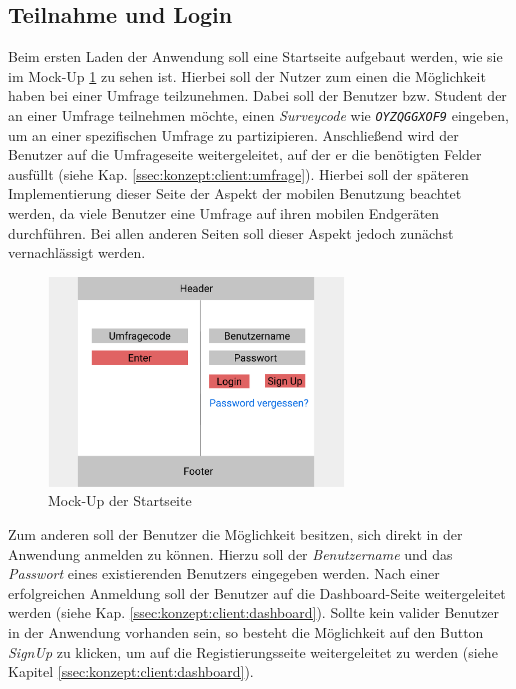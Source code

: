 \subsection{Teilnahme und Login}

Beim ersten Laden der Anwendung soll eine Startseite aufgebaut werden, wie sie im Mock-Up \ref{fig:MockSignin} zu sehen ist. 
Hierbei soll der Nutzer zum einen die Möglichkeit haben bei einer Umfrage teilzunehmen. 
Dabei soll der Benutzer bzw. Student der an einer Umfrage teilnehmen möchte, einen \emph{Surveycode} wie \zb \emph{\texttt{OYZQGGXOF9}} eingeben, um an einer spezifischen Umfrage zu partizipieren. 
Anschließend wird der Benutzer auf die Umfrageseite weitergeleitet, auf der er die benötigten Felder ausfüllt (siehe Kap. \ref{ssec:konzept:client:umfrage}).
Hierbei soll der späteren Implementierung dieser Seite der Aspekt der mobilen Benutzung beachtet werden, da viele Benutzer eine Umfrage auf ihren mobilen Endgeräten durchführen. 
Bei allen anderen Seiten soll dieser Aspekt jedoch zunächst vernachlässigt werden.

\begin{figure}[H]
	\centering
	\includegraphics[width=0.7\textwidth]{img/konzeption/client/signin}
	\captionsetup{justification=centering, format=plain}
	\caption[Mock-Up der Startseite]{Mock-Up der Startseite \\\figma}
	\label{fig:MockSignin}
\end{figure}

Zum anderen soll der Benutzer die Möglichkeit besitzen, sich direkt in der Anwendung anmelden zu können.
Hierzu soll der \emph{Benutzername} und das \emph{Passwort} eines existierenden Benutzers eingegeben werden. 
Nach einer erfolgreichen Anmeldung soll der Benutzer auf die Dashboard-Seite weitergeleitet werden (siehe Kap. \ref{ssec:konzept:client:dashboard}).
Sollte kein valider Benutzer in der Anwendung vorhanden sein, so besteht die Möglichkeit auf den Button \emph{SignUp} zu klicken, um auf die Registierungsseite weitergeleitet zu werden (siehe Kapitel \ref{ssec:konzept:client:dashboard}).

